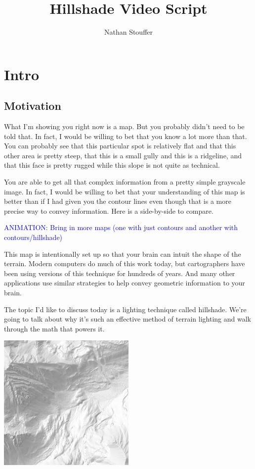 \documentclass{article}
\newcommand\animation[1]{\textcolor{blue}{ANIMATION: #1}}
\begin{document}
	
\title{Hillshade Video Script}
\author{Nathan Stouffer}
\date{}
\maketitle

\section{Intro}

\subsection{Motivation}

What I'm showing you right now is a map.
But you probably didn't need to be told that.
In fact, I would be willing to bet that you know a lot more than that.
You can probably see that this particular spot is relatively flat and that this other area is pretty steep, that this is a small gully and this is a ridgeline, and that this face is pretty rugged while this slope is not quite as technical.

You are able to get all that complex information from a pretty simple grayscale image.
In fact, I would be willing to bet that your understanding of this map is better than if I had given you the contour lines even though that is a more precise way to convey information.
Here is a side-by-side to compare.

\animation{Bring in more maps (one with just contours and another with contours/hillshade)}

This map is intentionally set up so that your brain can intuit the shape of the terrain.
Modern computers do much of this work today, but cartographers have been using versions of this technique for hundreds of years.
And many other applications use similar strategies to help convey geometric information to your brain.

The topic I'd like to discuss today is a lighting technique called hillshade.
We're going to talk about why it's such an effective method of terrain lighting and walk through the math that powers it.

\begin{center}
	\includegraphics[width=0.5\textwidth,frame]{assets/hillshade-example.png}
\end{center}
\end{document}
